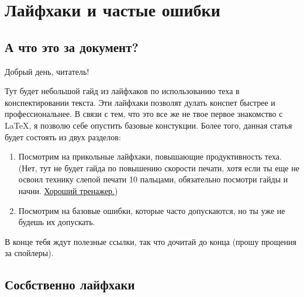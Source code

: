 \section{Лайфхаки и частые ошибки}
\subsection{А что это за документ?}

Добрый день, читатель!

Тут будет небольшой гайд из лайфхаков по использованию теха в конспектировании текста. Эти лайфхаки позволят дулать конспет быстрее и профессиональнее. 
В связи с тем, что это все же не твое первое знакомство с \LaTeX, я позволю себе опустить базовые констукции. 
Более того, данная статья будет состоять из двух разделов:
\begin{enumerate}
	\item Посмотрим на прикольные лайфхаки, повышающие продуктивность теха. 
	(Нет, тут не будет гайда по повышению скорости печати, хотя если ты еще не освоил технику слепой печати 10 пальцами, обязательно посмотри гайды и начни.  \href{https://www.ratatype.com}{Хороший тренажер.})
	\item Посмотрим на базовые ошибки, которые часто допускаются, но ты уже не будешь их допускать.
\end{enumerate}

В конце тебя ждут полезные ссылки, так что дочитай до конца (прошу прощения за спойлеры).

\subsection{Сосбственно лайфхаки}

